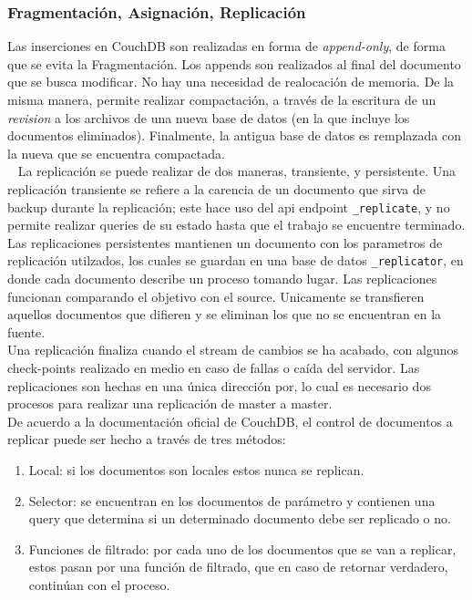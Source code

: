 \documentclass{article}
\begin{document}
            \subsubsection{Fragmentación, Asignación, Replicación}
                Las inserciones en CouchDB son realizadas en forma de \textit{append-only}, de forma que se evita la Fragmentación. Los appends son realizados al final del documento que se busca modificar. No hay una necesidad de realocación de memoria. De la misma manera, permite realizar compactación, a través de la escritura de un \textit{revision} a los archivos de una nueva base de datos (en la que incluye los documentos eliminados). Finalmente, la antigua base de datos es remplazada con la nueva que se encuentra compactada. \\ 
                La replicación se puede realizar de dos maneras, transiente, y persistente. Una replicación transiente se refiere a la carencia de un documento que sirva de backup durante la replicación; este hace uso del api endpoint \texttt{\_replicate}, y no permite realizar queries de su estado hasta que el trabajo se encuentre terminado. Las replicaciones persistentes mantienen un documento con los parametros de replicación utilzados, los cuales se guardan en una base de datos \texttt{\_replicator}, en donde cada documento describe un proceso tomando lugar. Las replicaciones funcionan comparando el objetivo con el source. Unicamente se transfieren aquellos documentos que difieren y se eliminan los que no se encuentran en la fuente. \\
                Una replicación finaliza cuando el stream de cambios se ha acabado, con algunos check-points realizado en medio en caso de fallas o caída del servidor. Las replicaciones son hechas en una única dirección por, lo cual es necesario dos procesos para realizar una replicación de master a master. \\
                De acuerdo a la documentación oficial de CouchDB, el control de documentos a replicar puede ser hecho a través de tres métodos: 
                \begin{enumerate}
                    \item Local: si los documentos son locales estos nunca se replican. 
                    \item Selector: se encuentran en los documentos de parámetro y contienen una query que determina si un determinado documento debe ser replicado o no. 
                    \item Funciones de filtrado: por cada uno de los documentos que se van a replicar, estos pasan por una función de filtrado, que en caso de retornar verdadero, continúan con el proceso. 
                \end{enumerate}
\end{document}
